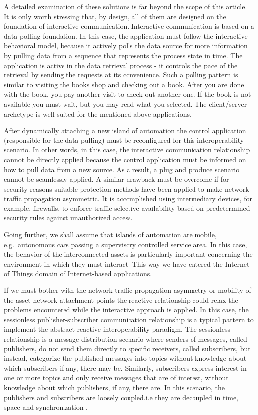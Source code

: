\documentclass{jacsart}
\begin{document}
A detailed examination of these solutions is far beyond the scope of this article. It is only worth stressing that, by design, all of them are designed on the foundation of interactive communication. Interactive communication is based on a data polling foundation. In this case, the application must follow the interactive behavioral model, because it actively polls the data source for more information by pulling data from a sequence that represents the process state in time. The application is active in the data retrieval process - it controls the pace of the retrieval by sending the requests at its convenience. Such a polling pattern is similar to visiting the books shop and checking out a book. After you are done with the book, you pay another visit to check out another one. If the book is not available you must wait, but you may read what you selected. The client/server archetype is well suited for the mentioned above applications.

After dynamically attaching a new island of automation the control application (responsible for the data pulling) must be reconfigured for this interoperability scenario. In other words, in this case, the interactive communication relationship cannot be directly applied because the control application must be informed on how to pull data from a new source. As a result, a plug and produce scenario cannot be seamlessly applied. A similar drawback must be overcome if for security reasons suitable protection methods have been applied to make network traffic propagation asymmetric. It is accomplished using intermediary devices, for example, firewalls, to enforce traffic selective availability based on predetermined security rules against unauthorized access.

Going further, we shall assume that islands of automation are mobile, e.g.~autonomous cars passing a supervisory controlled service area. In this case, the behavior of the interconnected assets is particularly important concerning the environment in which they must interact. This way we have entered the Internet of Things domain of Internet-based applications.

If we must bother with the network traffic propagation asymmetry or mobility of the asset network attachment-points the reactive relationship could relax the problems encountered while the interactive approach is applied. In this case, the sessionless publisher-subscriber communication relationship is a typical pattern to implement the abstract reactive interoperability paradigm. The sessionless relationship is a message distribution scenario where senders of messages, called publishers, do not send them directly to specific receivers, called subscribers, but instead, categorize the published messages into topics without knowledge about which subscribers if any, there may be. Similarly, subscribers express interest in one or more topics and only receive messages that are of interest, without knowledge about which publishers, if any, there are. In this scenario, the publishers and subscribers are loosely coupled.i.e they are decoupled in time, space and synchronization \cite{RefWorks:doc:5c44e246e4b0591b15ea9e59}.
\end{document}
